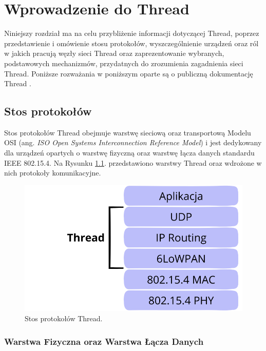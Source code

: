\chapter{Wprowadzenie do Thread}
\label{cha:wprowadzenie}

Niniejszy rozdział ma na celu przybliżenie informacji dotyczącej Thread, poprzez przedstawienie i omówienie stosu protokołów, wyszczególnienie urządzeń oraz ról w jakich pracują węzły sieci Thread oraz zaprezentowanie wybranych, podstawowych mechanizmów, przydatnych do zrozumienia zagadnienia sieci Thread. Poniższe rozważania w poniższym oparte są o publiczną dokumentację Thread \cite{thread-1.3.0}.

\section{Stos protokołów}
\label{sec:thread-stack}

    Stos protokołów Thread obejmuje warstwę sieciową oraz transportową Modelu OSI (ang. \textit{ISO Open Systems Interconnection Reference Model}) i jest dedykowany dla urządzeń opartych o warstwę fizyczną oraz warstwę łącza danych standardu IEEE 802.15.4. Na Rysunku \ref{fig:thread-sprotocol-stack}. przedstawiono warstwy Thread oraz wdrożone w nich protokoły komunikacyjne.

    \begin{figure}[H]
        \centering
        \includegraphics[width=0.8\linewidth]{graphics/thread-protocol-stack.png}
        \caption{Stos protokołów Thread.}
        \label{fig:thread-sprotocol-stack}
    \end{figure}

    \subsection{Warstwa Fizyczna oraz Warstwa Łącza Danych}

